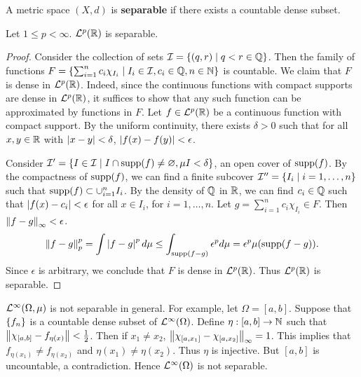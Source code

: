 \begin{definition}
    A metric space $(X,d)$ is \textbf{separable} if there exists a countable 
    dense subset.
\end{definition}

\begin{theorem}
    Let $1\leq p<\infty$. $\mathcal{L}^p(\mathbb{R})$ is separable.
\end{theorem}
\begin{proof}
    Consider the collection of sets $\mathcal{I} = \left\{ (q,r) \;\middle\vert\; q<r\in\mathbb{Q} \right\}$. Then the 
    family of functions $F = \left\{ \sum_{i=1}^n c_i\chi_{I_i} \;\middle\vert\; I_i\in\mathcal{I}, c_i\in\mathbb{Q}, n\in\mathbb{N} \right\}$
    is countable. We claim that $F$ is dense in $\mathcal{L}^p(\mathbb{R})$. Indeed, since 
    the continuous functions with compact supports are dense in $\mathcal{L}^p(\mathbb{R})$, 
    it suffices to show that any such function can be approximated by 
    functions in $F$. Let $f\in\mathcal{L}^p(\mathbb{R})$ be a continuous function with 
    compact support. By the uniform continuity, there exists $\delta>0$ such 
    that for all $x,y\in\mathbb{R}$ with $\left\lvert {x-y} \right\rvert<\delta$, $\left\lvert {f(x)-f(y)} \right\rvert<\epsilon$. 

    Consider $\I' = \Set{I\in\I}{I\cap\supp{f}\neq\varnothing, \mu{I}<\delta}$, an 
    open cover of $\supp{f}$. By the compactness of $\supp{f}$, we can find a finite 
    subcover $\mathcal{I}'' = \left\{ I_i \;\middle\vert\; i=1,\ldots,n \right\}$ such that $\supp{f}\subset \cup_{i=1}^n I_i$.
    By the density of $\mathbb{Q}$ in $\mathbb{R}$, we can find $c_i\in\mathbb{Q}$ such that 
    $\left\lvert {f(x)-c_i} \right\rvert<\epsilon$ for all $x\in I_i$, for $i=1,\ldots,n$. 
    Let $g = \sum_{i=1}^n c_i\chi_{I_i}\in F$. Then $\left\lVert {f-g} \right\rVert_\infty < \epsilon$.
    \begin{equation*}
        \norm{f-g}_p^p = \int \abs{f-g}^pd\mu 
        \leq \int_{\supp{f-g}} \epsilon^pd\mu = \epsilon^p\mu(\supp{f-g}).
    \end{equation*}
    Since $\epsilon$ is arbitrary, we conclude that $F$ is dense in $\mathcal{L}^p(\mathbb{R})$. 
    Thus $\mathcal{L}^p(\mathbb{R})$ is separable.
\end{proof}
\begin{remark}
    $\mathcal{L}^\infty(\Omega,\mu)$ is not separable in general. For example, let 
    $\Omega = [a,b]$. Suppose that $\left\{ {f_n} \right\}$ is a countable dense subset of 
    $\mathcal{L}^\infty(\Omega)$. Define $\eta:[a,b]\to\mathbb{N}$ such that 
    $\left\lVert {\chi_{[a,b]} - f_{\eta(x)}} \right\rVert<\frac{1}{2}$. Then if $x_1\neq x_2$, 
    $\left\lVert {\chi_{[a,x_1]} - \chi_{[a,x_2]}} \right\rVert_\infty = 1$. This implies that 
    $f_{\eta(x_1)}\neq f_{\eta(x_2)}$ and $\eta(x_1)\neq\eta(x_2)$. Thus $\eta$ 
    is injective. But $[a,b]$ is uncountable, a contradiction. Hence
    $\mathcal{L}^\infty(\Omega)$ is not separable.
\end{remark}